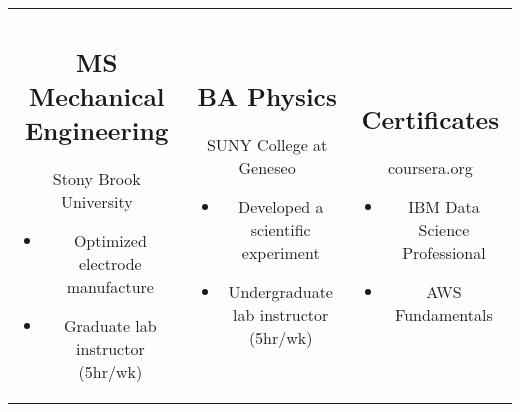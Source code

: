 \documentclass{article}
\begin{document}
\begin{minipage}{7.5in}
	\smallskip
	\begin{tabular*}{7.5in}{c c c}
		\begin{minipage}[t]{2.3in}

		\subsection*{MS Mechanical Engineering}
		Stony Brook University
		\begin{itemize}[noitemsep]
			\item Optimized electrode manufacture
			\item Graduate lab instructor (5hr/wk) 
		\end{itemize}
	\end{minipage} &
		\begin{minipage}[t]{2.7in}
		\subsection*{BA Physics}
		SUNY College at Geneseo
		\begin{itemize}[noitemsep]
			\item Developed a scientific experiment
			\item Undergraduate lab instructor (5hr/wk)
		\end{itemize}
	\end{minipage} &
		\begin{minipage}[t]{2.2in}
		\subsection*{Certificates}
		coursera.org
		\begin{itemize}[noitemsep]
			\item IBM Data Science Professional
			\item AWS Fundamentals
		\end{itemize}
	\end{minipage}\\
	\end{tabular*}
\end{minipage}
\end{document}
